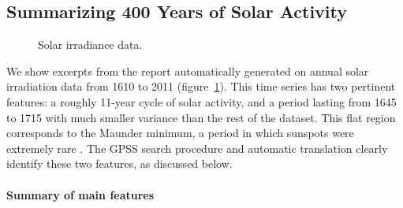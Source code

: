 \documentclass{article}
\begin{document}
\subsection{Summarizing 400 Years of Solar Activity}
\label{sec:solar}

\begin{figure}[h]
\centering
{}
\caption{
Solar irradiance data.}
\label{fig:solar}
\end{figure}

We show excerpts from the report automatically generated on annual solar irradiation data from 1610 to 2011 (figure~\ref{fig:solar}).
This time series has two pertinent features: a roughly 11-year cycle of solar activity, and a period lasting from 1645 to 1715 with much smaller variance than the rest of the dataset.  This flat region corresponds to the Maunder minimum, a period in which sunspots were extremely rare \citep{lean1995reconstruction}.
The GPSS search procedure and automatic translation clearly identify these two features, as discussed below.

\paragraph{Summary of main features}
\end{document}
